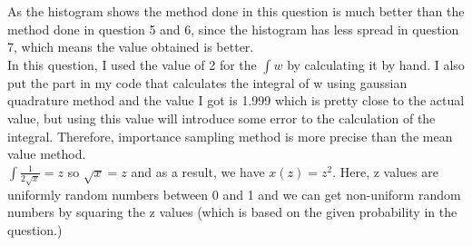 \documentclass[letterpaper,12pt]{article}
\begin{document}
As the histogram shows the method done in this question is much better than the method done in question 5 and 6, since the histogram has less spread in question 7, which means the value obtained is better.
\\In this question, I used the value of 2 for the $\int w$ by calculating it by hand. I also put the part in my code that calculates the integral of w using gaussian quadrature method and the value I got is 1.999 which is pretty close to the actual value, but using this value will introduce some error to the calculation of the integral. Therefore, importance sampling method is more precise than the mean value method.
\\ $\int \frac{1}{2 \sqrt x}= z $ so $\sqrt x = z$ and as a result, we have $x(z) =z^2$. Here, z values are uniformly random numbers between 0 and 1 and we can get  non-uniform random numbers by squaring the z values (which is based on the given probability in the question.)
\end{document}
